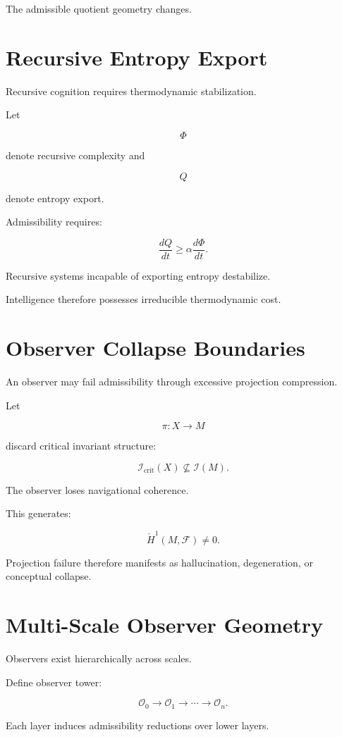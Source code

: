 \documentclass[12pt,openany]{book}
\theoremstyle{plain}
\theoremstyle{definition}
\theoremstyle{remark}
\begin{document}
The admissible quotient geometry changes.

\section{Recursive Entropy Export}

Recursive cognition requires thermodynamic stabilization.

Let

\[
\Phi
\]

denote recursive complexity and

\[
Q
\]

denote entropy export.

Admissibility requires:

\[
\frac{dQ}{dt}
\geq
\alpha
\frac{d\Phi}{dt}.
\]

Recursive systems incapable of exporting entropy destabilize.

Intelligence therefore possesses irreducible thermodynamic cost.

\section{Observer Collapse Boundaries}

An observer may fail admissibility through excessive projection
compression.

Let

\[
\pi :
X \to M
\]

discard critical invariant structure:

\[
\mathcal{I}_{\mathrm{crit}}(X)
\not\subseteq
\mathcal{I}(M).
\]

The observer loses navigational coherence.

This generates:

\[
\check{H}^1(M,\mathcal{F})
\neq
0.
\]

Projection failure therefore manifests as hallucination,
degeneration, or conceptual collapse.

\section{Multi-Scale Observer Geometry}

Observers exist hierarchically across scales.

Define observer tower:

\[
\mathcal{O}_0
\to
\mathcal{O}_1
\to
\cdots
\to
\mathcal{O}_n.
\]

Each layer induces admissibility reductions over lower layers.
\end{document}
